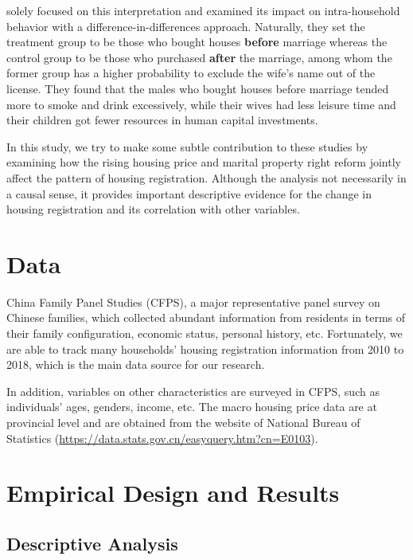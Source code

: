 \documentclass[11pt]{article}
\begin{document}
\citet{WANG2014192} solely focused on this interpretation and examined its impact on intra-household behavior 
with a difference-in-differences approach. Naturally, they set the treatment group to be those who bought houses \textbf{before} marriage whereas the control group to be those who purchased \textbf{after} the marriage, among whom the former group has a higher probability to exclude the wife's name out of the license. They found that the males who bought houses before marriage tended more to smoke and drink excessively, while their wives had less leisure time and their children got fewer resources in human capital investments. 

In this study, we try to make some subtle contribution to these studies by examining how the rising housing price and marital property right reform jointly affect the pattern of housing registration. Although the analysis not necessarily in a causal sense, it provides important descriptive evidence for the change in housing registration and its correlation with other variables.


\section{Data} \label{sec:data}

China Family Panel Studies (CFPS), a major representative panel survey on Chinese families, which collected abundant information from residents in terms of their family configuration, economic status, personal history, etc. Fortunately, we are able to track many households' housing registration information from 2010 to 2018, which is the main data source for our research.

In addition, variables on other characteristics are surveyed in CFPS, such as individuals' ages, genders, income, etc. The macro housing price data are at provincial level and are obtained from the website of National Bureau of Statistics (\href{https://data.stats.gov.cn/easyquery.htm?cn=E0103}{https://data.stats.gov.cn/easyquery.htm?cn=E0103}).

\section{Empirical Design and Results} \label{sec:method}

\subsection{Descriptive Analysis}
\end{document}
